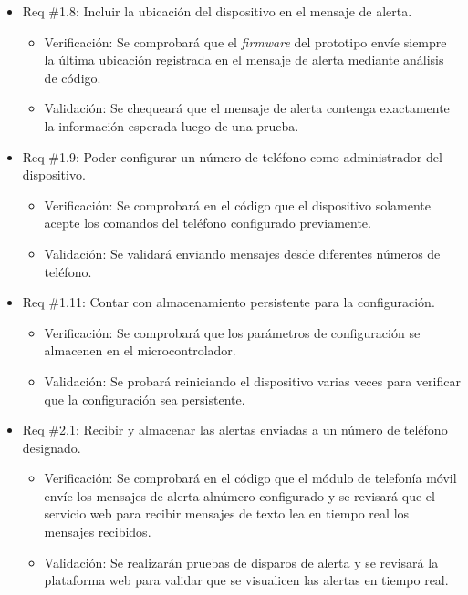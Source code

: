 \documentclass[
11pt, %
]{charter}
\begin{document}
\begin{itemize}
\item Req \#1.8: Incluir la ubicación del dispositivo en el mensaje de alerta.

\begin{itemize}
	\item Verificación: Se comprobará que el \textit{firmware} del prototipo envíe siempre la última ubicación registrada en el mensaje de alerta mediante análisis de código.
	\item Validación: Se chequeará que el mensaje de alerta contenga exactamente la información esperada luego de una prueba.
\end{itemize}

\item Req \#1.9: Poder configurar un número de teléfono como administrador del dispositivo.

\begin{itemize}
	\item Verificación: Se comprobará en el código que el dispositivo solamente acepte los comandos del teléfono configurado previamente.
	\item Validación: Se validará enviando mensajes desde diferentes números de teléfono.
\end{itemize}

\item Req \#1.11: Contar con almacenamiento persistente para la configuración.

\begin{itemize}
	\item Verificación: Se comprobará que los parámetros de configuración se almacenen en el microcontrolador.
	\item Validación: Se probará reiniciando el dispositivo varias veces para verificar que la configuración sea persistente.
\end{itemize}

\item Req \#2.1: Recibir y almacenar las alertas enviadas a un número de teléfono designado.

\begin{itemize}
	\item Verificación: Se comprobará en el código que el módulo de telefonía móvil envíe los mensajes de alerta alnúmero configurado y se revisará que el servicio web para recibir mensajes de texto lea en tiempo real los mensajes recibidos.
	\item Validación: Se realizarán pruebas de disparos de alerta y se revisará la plataforma web para validar que se visualicen las alertas en tiempo real.
\end{itemize}

\end{itemize}
\end{document}
